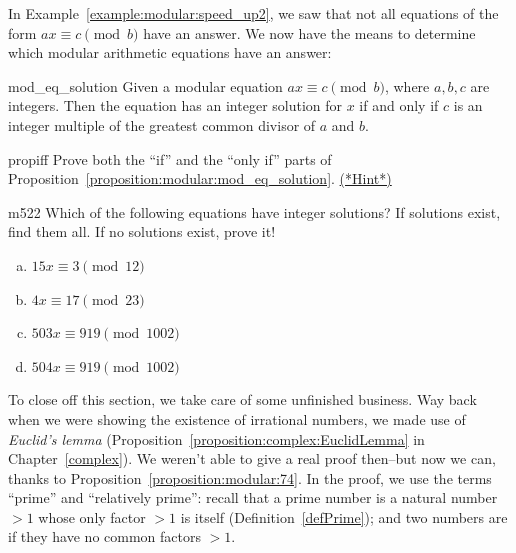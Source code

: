 In Example~\ref{example:modular:speed_up2}, we saw that not all equations of the form $ax \equiv c \pmod b$ have an answer.  We  now have the means to determine which modular arithmetic equations have an answer:

\begin{prop}{mod_eq_solution} 
Given a modular equation $ax \equiv c\pmod{b}$, where $a,b,c$ are  integers. Then the equation has an integer solution for $x$ if and only if $c$ is an integer multiple of the greatest common divisor of $a$ and $b$.  
\end{prop}

\begin{exercise}{propiff}
Prove both the ``if''  and the ``only if'' parts of Proposition~\ref{proposition:modular:mod_eq_solution}.
\hyperref[sec:modular_arithmetic:hints]{(*Hint*)}
\end{exercise}


\begin{exercise}{m522}
Which of the following equations have integer solutions? If solutions exist, find them all. If no solutions exist, prove it!
\begin{enumerate}[(a)]
\item
$15x \equiv 3 \pmod{12}$
\item
$4x \equiv 17 \pmod{23}$
\item
$503x \equiv 919 \pmod{1002}$
\item
$504x \equiv 919 \pmod{1002}$
\end{enumerate}

\end{exercise}

To close off this section, we take care of some unfinished business. Way back when we were showing the existence of irrational numbers, we made use of \emph{Euclid's lemma} (Proposition~\ref{proposition:complex:EuclidLemma} in Chapter~\ref{complex}). We weren't able to give a real proof then--but now we can, thanks to Proposition~\ref{proposition:modular:74}. In the proof, we use the terms ``prime'' and ``relatively prime'': recall that a prime number is a natural number $>1$ whose only factor $>1$ is itself (Definition~\ref{defPrime}); and two numbers are  if they have no common factors $>1$.

